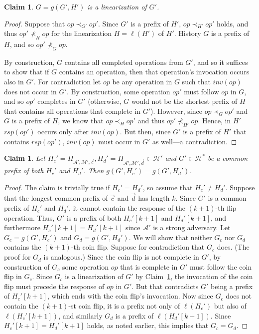 \documentclass[11pt,letterpaper]{article}
\newtheorem{claim}[theorem]{Claim}
\renewcommand{\AA}{\mathcal{A}}
\newcommand{\HH}{\mathcal{H}}
\newcommand{\MM}{\mathcal{M}}
\newcommand{\vc}{{\vec{c}}}
\newcommand{\vd}{{\vec{d}}}
\newcommand{\op}{\ensuremath{\mathit{op}}}
\newcommand{\inv}[1]{\ensuremath{inv(#1)}}
\newcommand{\rsp}[1]{\ensuremath{rsp(#1)}}
\begin{document}
\begin{claim}\label{clm:prefix-lin-necessary-lin}
$G=g(G',H')$ is a linearization of $G'$.
\end{claim}
\begin{proof}
Suppose that $\op\prec_{G'} \op'$.
Since $G'$ is a prefix of $H'$, $\op\prec_{H'} \op'$ holds, and thus $\op'\not\prec_{H} \op$ for the linearization $H=\ell(H')$ of $H'$.
History $G$ is a prefix of $H$, and so $\op'\not\prec_{G} \op$.

By construction, $G$ contains all completed operations from $G'$, and so it suffices to show that if $G$ contains an operation, then that operation's invocation occurs also in $G'$.
For contradiction let $\op$ be any operation in $G$ such that $\inv{\op}$ does not occur in $G'$.
By construction, some operation $\op'$ must follow $\op$ in $G$,
and so $\op'$ completes in $G'$ (otherwise, $G$ would not be the shortest prefix of $H$ that contains all operations that complete in $G'$).
However, since $\op\prec_G \op'$ and $G$ is a prefix of $H$, we know that $\op\prec_{H} \op'$ and thus $\op'\not\prec_{H'} \op$.
Hence, in $H'$ $\rsp{\op'}$ occurs only after $\inv{\op}$.
But then, since $G'$ is a prefix of $H'$ that contains $\rsp{\op'}$, $\inv{\op}$ must occur in $G'$ as well---a contradiction.
\end{proof}



\begin{claim}\label{clm:prefix-lin-necessary-extends}
Let $H_c'=H_{\AA',\MM',\vc}, H_d'=H_{\AA',\MM',\vd}\in\HH'$ and $G'\in\HH^\ast$ be a common prefix of both $H_c'$ and $H_d'$.
Then $g(G',H_c')=g(G',H_d')$.
\end{claim}
\begin{proof}
The claim is trivially true if $H_c' = H_d'$, so assume that $H_c' \neq H_d'$.
Suppose that the longest common prefix of $\vc$ and $\vd$ has length $k$.
Since $G'$ is a common prefix of $H_c'$ and $H_d'$, it cannot contain the response of the $(k+1)$-th flip operation. Thus, $G'$ is a prefix of both $H_c'[k+1]$ and $H_d'[k+1]$, and furthermore $H_c'[k+1]=H_d'[k+1]$ since $\AA'$ is a strong adversary.
Let $G_c = g(G',H_c')$ and $G_d = g(G',H_d')$.
We will show that neither $G_c$ nor $G_d$ contains the $(k+1)$-th coin flip.
Suppose for contradiction that $G_c$ does.  (The proof for $G_d$ is analogous.)
Since the coin flip is not complete in $G'$, by construction of $G_c$ some operation $\op$ that is complete in $G'$ must follow the coin flip in $G_c$.
Since $G_c$ is a linearization of $G'$ by Claim~\ref{clm:prefix-lin-necessary-lin},
the invocation of the coin flip must precede the response of $\op$ in $G'$.
But that contradicts $G'$ being a prefix of $H_c'[k+1]$, which ends with the coin flip's invocation.
Now since $G_c$ does not contain the $(k+1)$-st coin flip, it is a prefix not only of $\ell(H_c')$
but also of $\ell(H_c'[k+1])$, and similarly $G_d$ is a prefix of $\ell(H_d'[k+1])$.
Since $H_c'[k+1]=H_d'[k+1]$ holds, as noted earlier, this implies that $G_c=G_d$.
\end{proof}
\end{document}
